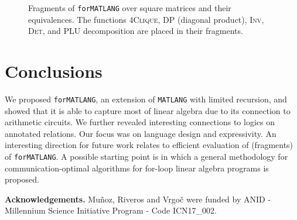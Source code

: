 \documentclass[sigconf]{acmart}
\newcommand{\lang}{\texttt{MATLANG}\xspace}
\newcommand{\langfor}{\texttt{for}\text{-}\texttt{MATLANG}\xspace}
\begin{document}
\begin{figure}
	
	\caption{Fragments of \langfor over square matrices and their equivalences. The functions \textsc{4Clique}, \textsc{DP} (diagonal product), \textsc{Inv}, \textsc{Det}, and \textsc{PLU} decomposition are placed in their fragments.} \label{thefigure}
\end{figure}

\section{Conclusions}\label{sec:conclude}
We proposed \langfor, an extension of \lang with limited recursion,
and showed that it is able to capture most of linear algebra due to its
connection to arithmetic circuits. We further revealed interesting connections
to logics on annotated relations. Our focus was on language design and
expressivity. An interesting direction for future work relates to efficient
evaluation of (fragments) of \langfor. A possible starting point is \cite{Christ_2013}
in which a general methodology for communication-optimal algorithms
for for-loop linear algebra programs is proposed.

\medskip
\noindent \textbf{Acknowledgements.} Mu\~noz, Riveros and Vrgo\v{c} were funded by ANID - Millennium Science Initiative Program - Code ICN17\_002.



\balance

\end{document}
